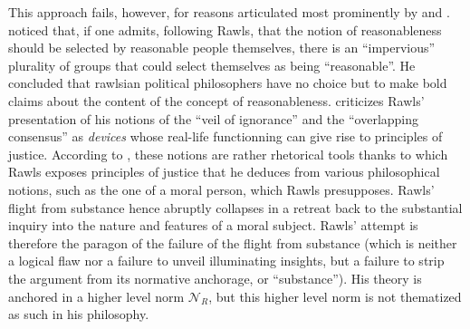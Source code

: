 \documentclass[preprint, french, english, 11pt, authoryear]{elsarticle}%
\begin{document}
This approach fails, however, for reasons articulated most prominently by \cite{habermas_reconciliation_1995} and \cite{estlund_democratic_2009}. \citet{estlund_democratic_2009} noticed that, if one admits, following Rawls, that the notion of reasonableness should be selected by reasonable people themselves, there is an “impervious” plurality of groups that could select themselves as being “reasonable”. He concluded that rawlsian political philosophers have no choice but to make bold claims about the content of the concept of reasonableness. \cite{habermas_reconciliation_1995} criticizes Rawls' presentation of his notions of the “veil of ignorance” and the “overlapping consensus” as \emph{devices} whose real-life functionning can give rise to principles of justice. According to \cite{habermas_reconciliation_1995}, these notions are rather rhetorical tools thanks to which Rawls exposes principles of justice that he deduces from various philosophical notions, such as the one of a moral person, which Rawls presupposes. Rawls' flight from substance hence abruptly collapses in a retreat back to the substantial inquiry into the nature and features of a moral subject.  Rawls' attempt is therefore the paragon of the failure of the flight from substance (which is neither a logical flaw nor a failure to unveil illuminating insights, but a failure to strip the argument from its normative anchorage, or “substance”). His theory is anchored in a higher level norm $\mathscr{N}_R$, but this higher level norm is not thematized as such in his philosophy.
\end{document}
